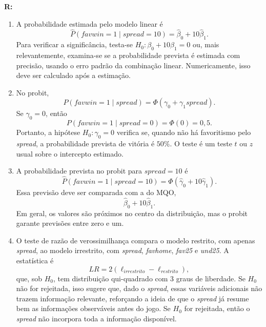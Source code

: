 \documentclass[12pt,letterpaper,onecolumn]{exam}
\renewenvironment{solution}
{\par\noindent\textbf{R:}\enspace\color{blue}}
{\par\color{black}}
\begin{document}
\begin{questions}
\begin{solution}
\begin{enumerate}[label=(\roman*)]
    \item A probabilidade estimada pelo modelo linear é
    \[
    \widehat{P}(favwin=1\mid spread=10)=\hat{\beta}_0+10\hat{\beta}_1.
    \]
    Para verificar a significância, testa-se \(H_0:\beta_0+10\beta_1=0\) ou, mais relevantemente, examina-se se a probabilidade prevista é estimada com precisão, usando o erro padrão da combinação linear. Numericamente, isso deve ser calculado após a estimação.

    \item No probit,
    \[
    P(favwin=1\mid spread)=\Phi(\gamma_0+\gamma_1 spread).
    \]
    Se \(\gamma_0=0\), então
    \[
    P(favwin=1\mid spread=0)=\Phi(0)=0{,}5.
    \]
    Portanto, a hipótese \(H_0:\gamma_0=0\) verifica se, quando não há favoritismo pelo \textit{spread}, a probabilidade prevista de vitória é \(50\%\). O teste é um teste \(t\) ou \(z\) usual sobre o intercepto estimado.

    \item A probabilidade prevista no probit para \(spread=10\) é
    \[
    \widehat{P}(favwin=1\mid spread=10)=\Phi(\hat{\gamma}_0+10\hat{\gamma}_1).
    \]
    Essa previsão deve ser comparada com a do MQO,
    \[
    \hat{\beta}_0+10\hat{\beta}_1.
    \]
    Em geral, os valores são próximos no centro da distribuição, mas o probit garante previsões entre zero e um.

    \item O teste de razão de verossimilhança compara o modelo restrito, com apenas \textit{spread}, ao modelo irrestrito, com \textit{spread}, \textit{favhome}, \textit{fav25} e \textit{und25}. A estatística é
    \[
    LR=2(\ell_{irrestrito}-\ell_{restrito}),
    \]
    que, sob \(H_0\), tem distribuição qui-quadrado com \(3\) graus de liberdade. Se \(H_0\) não for rejeitada, isso sugere que, dado o \textit{spread}, essas variáveis adicionais não trazem informação relevante, reforçando a ideia de que o \textit{spread} já resume bem as informações observáveis antes do jogo. Se \(H_0\) for rejeitada, então o \textit{spread} não incorpora toda a informação disponível.
\end{enumerate}
\end{solution}

\end{questions}



\end{document}
